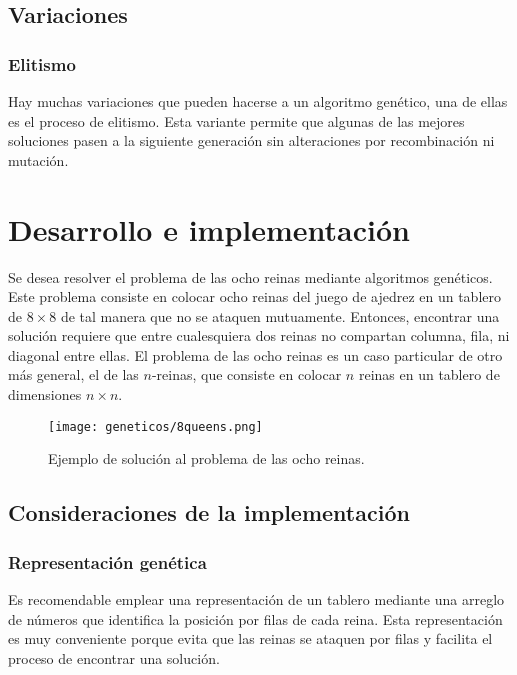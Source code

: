 \subsection{Variaciones}

\subsubsection{Elitismo}

Hay muchas variaciones que pueden hacerse a un algoritmo genético, una de ellas es el proceso de elitismo. Esta variante permite que algunas de las mejores soluciones pasen a la siguiente generación sin alteraciones por recombinación ni mutación.


\section{Desarrollo e implementaci\'on}

Se desea resolver el problema de las ocho reinas mediante algoritmos genéticos.  Este problema consiste en colocar ocho reinas del juego de ajedrez en un tablero de \(8 \times 8\) de tal manera que no se ataquen mutuamente. Entonces, encontrar una solución requiere que entre cualesquiera dos reinas no compartan columna, fila, ni diagonal entre ellas. El problema de las ocho reinas es un caso particular de otro más general, el de las \(n\)-reinas, que consiste en colocar \(n\) reinas en un tablero de dimensiones \(n \times n\).

\begin{figure}[H]
  \centering
  \texttt{[image: geneticos/8queens.png]}
  \caption{Ejemplo de solución al problema de las ocho reinas. \protect\footnotemark}
  \label{fig:queens}
\end{figure}

\subsection{Consideraciones de la implementaci\'on}

\subsubsection{Representaci\'on gen\'etica}\par

Es recomendable emplear una representación de un tablero mediante una arreglo de números que identifica la posición por filas de cada reina.
Esta representación es muy conveniente porque evita que las reinas se ataquen por filas y facilita el proceso de encontrar una solución.

